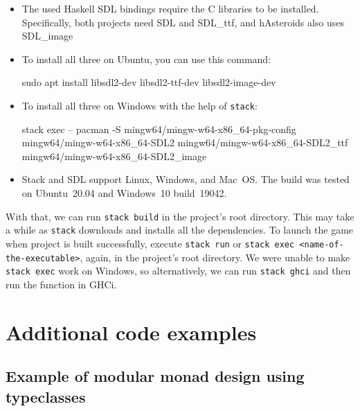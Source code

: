 \documentclass[
  digital, %
  color,   %
  table,   %
  oneside, %
  lof,     %
  lot,     %
]{fithesis3}
\begin{document}
{
\begin{itemize}[\indent]
    \item The used Haskell SDL bindings require the C libraries to be installed.
    Specifically, both projects need SDL and SDL\_ttf, and hAsteroids also uses SDL\_image 
    \item To install all three on Ubuntu, you can use this command:
    \begin{term}
    sudo apt install libsdl2-dev libsdl2-ttf-dev libsdl2-image-dev
    \end{term}
    
    \item To install all three on Windows with the help of \texttt{stack}:
    \begin{term}
    stack exec -- pacman -S mingw64/mingw-w64-x86_64-pkg-config mingw64/mingw-w64-x86_64-SDL2 mingw64/mingw-w64-x86_64-SDL2_ttf mingw64/mingw-w64-x86_64-SDL2_image
    \end{term}
\end{itemize}

\begin{itemize}[\indent]
    \item Stack and SDL support Linux, Windows, and Mac~OS.
    The build was tested on Ubuntu~20.04 and Windows~10 build~19042.
\end{itemize}

\noindent With that, we can run \texttt{stack build} in the project's root directory.
This may take a while as \texttt{stack} downloads and installs all the dependencies.
To launch the game when project is built successfully,
execute \texttt{stack run} or \texttt{stack exec <name-of-the-executable>},
again, in the project's root directory.
We were unable to make \texttt{stack exec} work on Windows, so alternatively,
we can run \texttt{stack ghci} and then run the  function in GHCi.



\chapter{Additional code examples}

\section{Example of modular monad design using typeclasses}
\label{app:classes}

}
\end{document}
